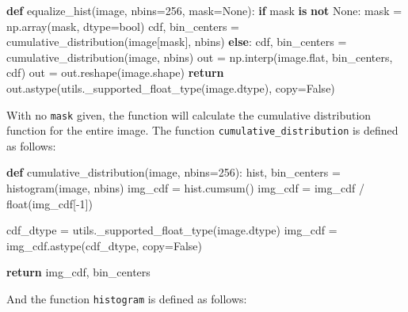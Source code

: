 \documentclass[11pt]{article}
\newenvironment{Shaded}{}{}
\newcommand{\KeywordTok}[1]{\textcolor[rgb]{0.00,0.44,0.13}{\textbf{{#1}}}}
\newcommand{\DecValTok}[1]{\textcolor[rgb]{0.25,0.63,0.44}{{#1}}}
\newcommand{\NormalTok}[1]{{#1}}
\newcommand{\VariableTok}[1]{\textcolor[rgb]{0.10,0.09,0.49}{{#1}}}
\newcommand{\ControlFlowTok}[1]{\textcolor[rgb]{0.00,0.44,0.13}{\textbf{{#1}}}}
\newcommand{\OperatorTok}[1]{\textcolor[rgb]{0.40,0.40,0.40}{{#1}}}
\newcommand{\BuiltInTok}[1]{{#1}}
\begin{document}
\begin{Shaded}
\begin{Highlighting}[]
\KeywordTok{def}\NormalTok{ equalize\_hist(image, nbins}\OperatorTok{=}\DecValTok{256}\NormalTok{, mask}\OperatorTok{=}\VariableTok{None}\NormalTok{):}
    \ControlFlowTok{if}\NormalTok{ mask }\KeywordTok{is} \KeywordTok{not} \VariableTok{None}\NormalTok{:}
\NormalTok{        mask }\OperatorTok{=}\NormalTok{ np.array(mask, dtype}\OperatorTok{=}\BuiltInTok{bool}\NormalTok{)}
\NormalTok{        cdf, bin\_centers }\OperatorTok{=}\NormalTok{ cumulative\_distribution(image[mask], nbins)}
    \ControlFlowTok{else}\NormalTok{:}
\NormalTok{        cdf, bin\_centers }\OperatorTok{=}\NormalTok{ cumulative\_distribution(image, nbins)}
\NormalTok{    out }\OperatorTok{=}\NormalTok{ np.interp(image.flat, bin\_centers, cdf)}
\NormalTok{    out }\OperatorTok{=}\NormalTok{ out.reshape(image.shape)}
    \ControlFlowTok{return}\NormalTok{ out.astype(utils.\_supported\_float\_type(image.dtype), copy}\OperatorTok{=}\VariableTok{False}\NormalTok{)}
\end{Highlighting}
\end{Shaded}

With no \texttt{mask} given, the function will calculate the cumulative
distribution function for the entire image. The function
\texttt{cumulative\_distribution} is defined as follows:

\begin{Shaded}
\begin{Highlighting}[]
\KeywordTok{def}\NormalTok{ cumulative\_distribution(image, nbins}\OperatorTok{=}\DecValTok{256}\NormalTok{):}
\NormalTok{    hist, bin\_centers }\OperatorTok{=}\NormalTok{ histogram(image, nbins)}
\NormalTok{    img\_cdf }\OperatorTok{=}\NormalTok{ hist.cumsum()}
\NormalTok{    img\_cdf }\OperatorTok{=}\NormalTok{ img\_cdf }\OperatorTok{/} \BuiltInTok{float}\NormalTok{(img\_cdf[}\OperatorTok{{-}}\DecValTok{1}\NormalTok{])}

\NormalTok{    cdf\_dtype }\OperatorTok{=}\NormalTok{ utils.\_supported\_float\_type(image.dtype)}
\NormalTok{    img\_cdf }\OperatorTok{=}\NormalTok{ img\_cdf.astype(cdf\_dtype, copy}\OperatorTok{=}\VariableTok{False}\NormalTok{)}

    \ControlFlowTok{return}\NormalTok{ img\_cdf, bin\_centers}
\end{Highlighting}
\end{Shaded}

And the function \texttt{histogram} is defined as follows:
\end{document}
